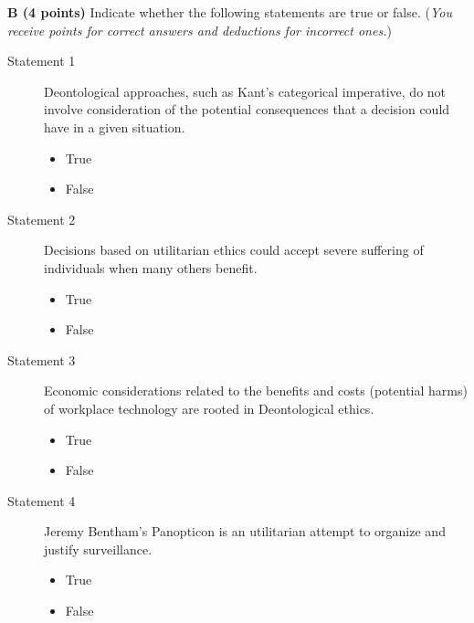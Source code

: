 \documentclass[12pt]{scrartcl}
\begin{document}
\vspace{0.3cm}
\newpage
\textbf{B (4 points)} Indicate whether the following statements are true or false. (\textit{You receive points for correct answers and deductions for incorrect ones.})
\\
\begin{description}
	\item[Statement 1] Deontological approaches, such as Kant's categorical imperative, do not involve consideration of the potential consequences that a decision could have in a given situation.

\begin{multicols}{2}
	\begin{itemize}[label={\Square}]
		\item[\checkmark] True
		\item False
	\end{itemize}
\end{multicols}

\item[Statement 2] Decisions based on utilitarian ethics could accept severe suffering of individuals when many others benefit.

\begin{multicols}{2}
	\begin{itemize}[label={\Square}]
		\item[\checkmark] True
		\item False
	\end{itemize}
\end{multicols}

\item[Statement 3] Economic considerations related to the benefits and costs (potential harms) of workplace technology are rooted in Deontological ethics.

\begin{multicols}{2}
	\begin{itemize}[label={\Square}]
		\item True
		\item[\checkmark] False
	\end{itemize}
\end{multicols}

\item[Statement 4] Jeremy Bentham's Panopticon is an utilitarian attempt to organize and justify surveillance.

\begin{multicols}{2}
	\begin{itemize}[label={\Square}]
		\item[\checkmark] True
		\item False
	\end{itemize}
\end{multicols}

\end{description}
\end{document}
